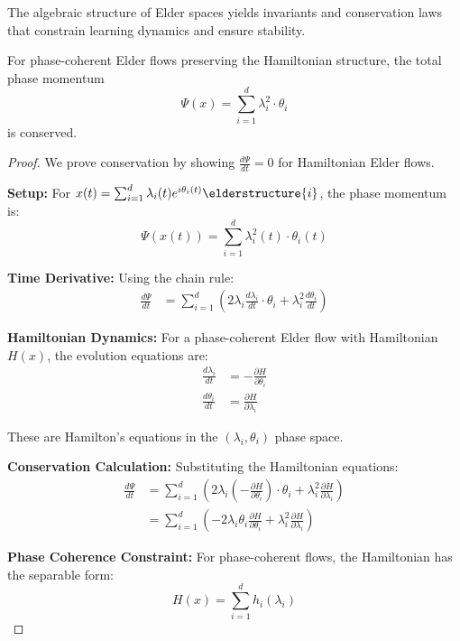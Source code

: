 The algebraic structure of Elder spaces yields invariants and conservation laws that constrain learning dynamics and ensure stability.

\begin{theorem}
\label{thm:phase_conservation}
For phase-coherent Elder flows preserving the Hamiltonian structure, the total phase momentum
\begin{equation}
\Psi(x) = \sum_{i=1}^{d} \lambda_i^2 \cdot \theta_i
\end{equation}
is conserved.
\end{theorem}

\begin{proof}
We prove conservation by showing $\frac{d\Psi}{dt} = 0$ for Hamiltonian Elder flows.

\textbf{Setup:}
For $x(t) = \sum_{i=1}^{d} \lambda_i(t) e^{i\theta_i(t)} \elderstructure{i}$, the phase momentum is:
$$\Psi(x(t)) = \sum_{i=1}^{d} \lambda_i^2(t) \cdot \theta_i(t)$$

\textbf{Time Derivative:}
Using the chain rule:
\begin{align}
\frac{d\Psi}{dt} &= \sum_{i=1}^{d} \left(2\lambda_i \frac{d\lambda_i}{dt} \cdot \theta_i + \lambda_i^2 \frac{d\theta_i}{dt}\right)
\end{align}

\textbf{Hamiltonian Dynamics:}
For a phase-coherent Elder flow with Hamiltonian $H(x)$, the evolution equations are:
\begin{align}
\frac{d\lambda_i}{dt} &= -\frac{\partial H}{\partial \theta_i} \\
\frac{d\theta_i}{dt} &= \frac{\partial H}{\partial \lambda_i}
\end{align}

These are Hamilton's equations in the $(\lambda_i, \theta_i)$ phase space.

\textbf{Conservation Calculation:}
Substituting the Hamiltonian equations:
\begin{align}
\frac{d\Psi}{dt} &= \sum_{i=1}^{d} \left(2\lambda_i \left(-\frac{\partial H}{\partial \theta_i}\right) \cdot \theta_i + \lambda_i^2 \frac{\partial H}{\partial \lambda_i}\right) \\
&= \sum_{i=1}^{d} \left(-2\lambda_i \theta_i \frac{\partial H}{\partial \theta_i} + \lambda_i^2 \frac{\partial H}{\partial \lambda_i}\right)
\end{align}

\textbf{Phase Coherence Constraint:}
For phase-coherent flows, the Hamiltonian has the separable form:
$$H(x) = \sum_{i=1}^{d} h_i(\lambda_i)$$


\end{proof}
